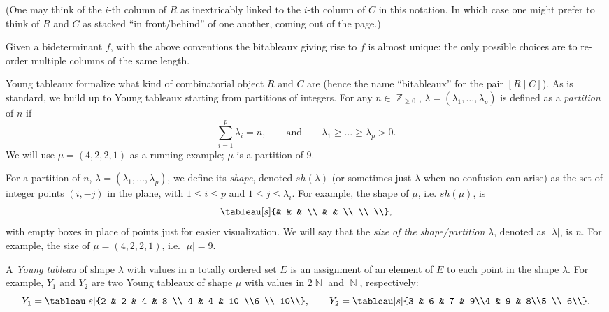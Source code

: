 \documentclass[11pt,reqno]{amsart}
\DeclareMathOperator{\Z}{\mathbb{Z}}
\DeclareMathOperator{\N}{\mathbb{N}}
\newcommand{\bitab}[2]{[#1\;|\;#2]}
\newcommand{\shapetab}[1]{sh(#1)}
\newcommand{\sizetab}[1]{|#1|}
\theoremstyle{definition}
\numberwithin{equation}{section}
\begin{document}
(One may think of the $i$-th column of $R$ as inextricably linked to the $i$-th column of $C$ in this notation. In which case one might prefer to think of $R$ and $C$ as stacked ``in front/behind'' of one another, coming out of the page.)

Given a bideterminant $f$, with the above conventions the bitableaux giving rise to $f$ is almost unique: the only possible choices are to re-order multiple columns of the same length. 

Young tableaux formalize what kind of combinatorial object $R$ and $C$ are (hence the name ``bitableaux'' for the pair $\bitab{R}{C}$). As is standard, we build up to Young tableaux starting from partitions of integers. For any $n \in \Z_{\ge 0}$, $\lambda = (\lambda_1, \ldots, \lambda_p)$ is defined as a \emph{partition} of $n$ if 
\[ \sum_{i=1}^p \lambda_i = n, \qquad \text{and}\qquad \lambda_1 \ge \ldots \ge \lambda_p > 0.\] 
We will use $\mu = (4, 2, 2, 1)$ as a running example; $\mu$ is a partition of $9$.

For a partition of $n$, $\lambda = (\lambda_1, \ldots, \lambda_p)$, we define its \emph{shape}, denoted $\shapetab{\lambda}$ (or sometimes just $\lambda$ when no confusion can arise) as the set of integer points $(i, -j)$ in the plane, with $1 \le i \le p$ and $1 \le j \le \lambda_i$. For example, the shape of $\mu$, i.e. $\shapetab{\mu}$, is 
\[ \tableau[s]{& & & \\ & & \\ \\ \\},\] with empty boxes in place of points just for easier visualization. We will say that the \emph{size of the shape/partition} $\lambda$, denoted as $\sizetab{\lambda}$, is $n$. For example, the size of $\mu = (4, 2, 2, 1)$, i.e. $\sizetab{\mu}=9$. 

A \emph{Young tableau} of shape $\lambda$ with values in a totally ordered set $E$ is an assignment of an element of $E$ to each point in the shape $\lambda$. For example, $Y_1$ and $Y_2$ are two Young tableaux of shape $\mu$ with values in $2\N$ and $\N$, respectively:
\[ Y_1 = \tableau[s]{2 & 2 & 4 & 8 \\ 4 & 4 & 10 \\6 \\ 10\\}, \qquad Y_2 = \tableau[s]{3 & 6 & 7 & 9\\4 & 9 & 8\\5 \\ 6\\}.\] 
\end{document}
